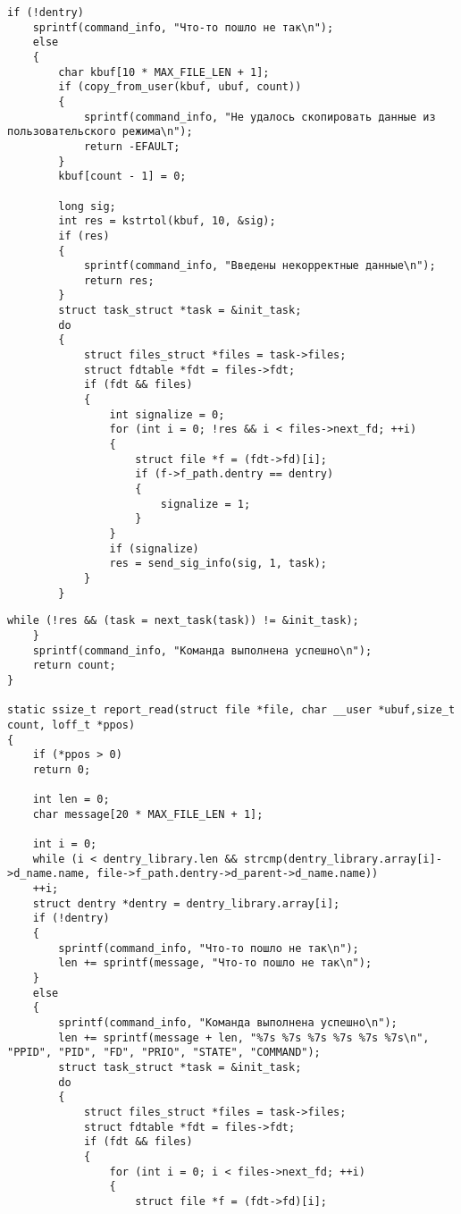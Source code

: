 \begin{center}
\begin{lstlisting}[label=listing_main_c3,caption=Файл main.c]
	if (!dentry)
	sprintf(command_info, "Что-то пошло не так\n");
	else
	{
		char kbuf[10 * MAX_FILE_LEN + 1];
		if (copy_from_user(kbuf, ubuf, count))
		{
			sprintf(command_info, "Не удалось скопировать данные из пользовательского режима\n");
			return -EFAULT;
		}
		kbuf[count - 1] = 0;
		
		long sig;
		int res = kstrtol(kbuf, 10, &sig);
		if (res)
		{
			sprintf(command_info, "Введены некорректные данные\n");
			return res;
		}
		struct task_struct *task = &init_task;
		do
		{
			struct files_struct *files = task->files;
			struct fdtable *fdt = files->fdt;
			if (fdt && files)
			{
				int signalize = 0;
				for (int i = 0; !res && i < files->next_fd; ++i)
				{
					struct file *f = (fdt->fd)[i];
					if (f->f_path.dentry == dentry)
					{
						signalize = 1;
					}
				}
				if (signalize)
				res = send_sig_info(sig, 1, task);
			}
		}
	\end{lstlisting}
\end{center}

\begin{center}
\begin{lstlisting}[label=listing_main_c4,caption=Файл main.c]
		while (!res && (task = next_task(task)) != &init_task);
	}
	sprintf(command_info, "Команда выполнена успешно\n");
	return count;
}

static ssize_t report_read(struct file *file, char __user *ubuf,size_t count, loff_t *ppos)
{
	if (*ppos > 0)
	return 0;
	
	int len = 0;
	char message[20 * MAX_FILE_LEN + 1];
	
	int i = 0;
	while (i < dentry_library.len && strcmp(dentry_library.array[i]->d_name.name, file->f_path.dentry->d_parent->d_name.name))
	++i;
	struct dentry *dentry = dentry_library.array[i];
	if (!dentry)
	{
		sprintf(command_info, "Что-то пошло не так\n");
		len += sprintf(message, "Что-то пошло не так\n");
	}
	else
	{
		sprintf(command_info, "Команда выполнена успешно\n");
		len += sprintf(message + len, "%7s %7s %7s %7s %7s %7s\n", "PPID", "PID", "FD", "PRIO", "STATE", "COMMAND");
		struct task_struct *task = &init_task;
		do
		{
			struct files_struct *files = task->files;
			struct fdtable *fdt = files->fdt;
			if (fdt && files)
			{
				for (int i = 0; i < files->next_fd; ++i)
				{
					struct file *f = (fdt->fd)[i];
	\end{lstlisting}
\end{center}


